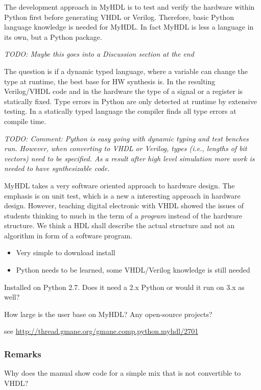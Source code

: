 \documentclass[10pt, conference, compsocconf]{IEEEtran}
\newcommand{\todo}[1]{{\emph{TODO: #1}}}
\begin{document}
The development approach in MyHDL is to test and verify the hardware within Python first
before generating VHDL or Verilog. Therefore, basic Python language knowledge is
needed for MyHDL. In fact MyHDL is less a language in its own, but a Python package.

\todo{Maybe this goes into a Discussion section at the end}

The question is if a dynamic typed language, where a variable can change the type
at runtime, the best base for HW synthesis is. In the resulting Verilog/VHDL code and
in the hardware the type of a signal or a register is statically fixed. Type errors in
Python are only detected at runtime by extensive testing. In a statically typed
language the compiler finds all type errors at compile time.

\todo{Comment: Python is easy going with dynamic typing and test benches run.
However, when converting to VHDL or Verilog, types (i.e., lengths of bit vectors)
need to be specified. As a result after high level simulation more work is needed
to have synthesizable code.}


MyHDL takes a very software oriented approach to hardware design. The emphasis
is on unit test, which is a new a interesting approach in hardware design.
However, teaching digital electronic with VHDL showed the issues of students
thinking to much in the term of a \emph{program} instead of the hardware
structure. We think a HDL shall describe the actual structure and not an
algorithm in form of a software program.


\begin{itemize}
\item Very simple to download install
\item Python needs to be learned, some VHDL/Verilog knowledge is still needed
\end{itemize}

Installed on Python 2.7. Does it need a 2.x Python or would it run on 3.x as well?

How large is the user base on MyHDL? Any open-source projects?

see \url{http://thread.gmane.org/gmane.comp.python.myhdl/2701}

\subsubsection{Remarks}

Why does the manual show code for a simple mix that is not convertible to VHDL?
\end{document}
